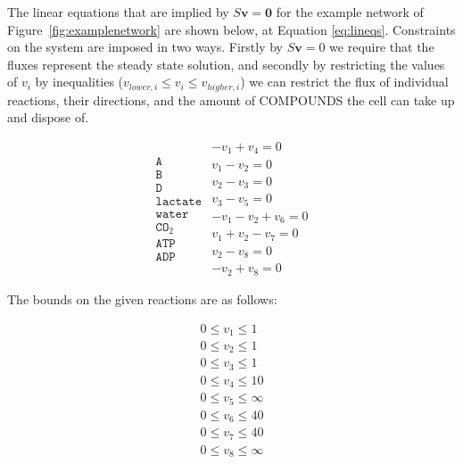 \documentclass[10pt,a4paper]{article}
\begin{document}
	The linear equations that are implied by $S\mathbf{v}=\mathbf{0}$ for the example network of Figure~\ref{fig:examplenetwork} are shown below, at Equation \ref{eq:lineqs}. Constraints on the system are imposed in two ways. Firstly by $S\mathbf{v}=0$ we require that the fluxes represent the steady state solution, and secondly by restricting the values of $v_i$ by inequalities ($v_{lower,i}\leq v_i \leq v_{higher,i}$) we can restrict the flux of individual reactions, their directions, and the amount of COMPOUNDS the cell can take up and dispose of. 
	

	\begin{equation}\label{eq:lineqs}
	\begin{matrix}
		\texttt{A}   \\
		\texttt{B}\\
		\texttt{D}\\
		\texttt{lactate}\\
		\texttt{water}\\
		\texttt{CO}_2\\
		\texttt{ATP}\\
		\texttt{ADP}
	\end{matrix}
		\begin{matrix}
			- v_1+v_4=0 \\
			v_1-v_2=0 \\
			v_2-v_3=0 \\
			v_3-v_5=0 \\
			-v_1-v_2+v_6=0 \\
			v_1+v_2-v_7=0 \\
			v_2-v_8=0 \\
			-v_2+v_8=0
		\end{matrix}
	\end{equation}

	The bounds on the given reactions are as follows: 

	\begin{equation}\label{eq:bounds}
		\begin{matrix}
			0\leq v_1 \leq 1\\
			0\leq v_2 \leq 1\\
			0\leq v_3 \leq 1\\
			0\leq v_4 \leq 10\\
			0\leq v_5 \leq \infty \\
			0\leq v_6 \leq 40\\
			0\leq v_7 \leq 40\\
			0\leq v_8 \leq \infty\\
		\end{matrix}
	\end{equation}
\end{document}
